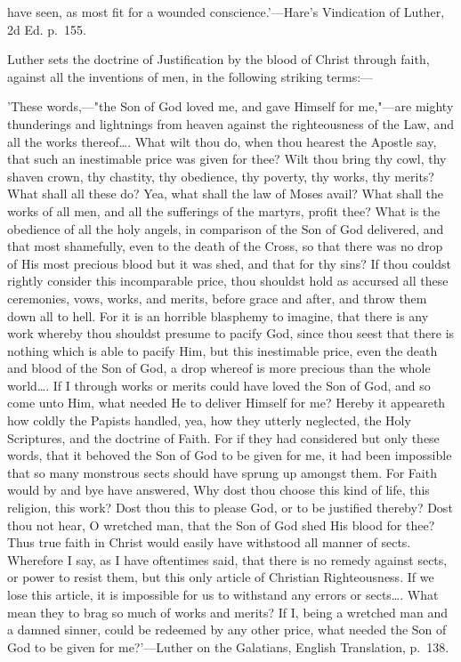 \documentclass[
]{book}
\begin{document}
{have seen, as most fit for a wounded conscience.'---Hare's Vindication of Luther, 2d Ed. p.~155.

  Luther sets the doctrine of Justification by the blood of Christ through faith, against all the inventions of men, in the following striking terms:---

  'These words,---"the Son of God loved me, and gave Himself for me,"---are mighty thunderings and lightnings from heaven against the righteousness of the Law, and all the works thereof\ldots. What wilt thou do, when thou hearest the Apostle say, that such an inestimable price was given for thee? Wilt thou bring thy cowl, thy shaven crown, thy chastity, thy obedience, thy poverty, thy works, thy merits? What shall all these do? Yea, what shall the law of Moses avail? What shall the works of all men, and all the sufferings of the martyrs, profit thee? What is the obedience of all the holy angels, in comparison of the Son of God delivered, and that most shamefully, even to the death of the Cross, so that there was no drop of His most precious blood but it was shed, and that for thy sins? If thou couldst rightly consider this incomparable price, thou shouldst hold as accursed all these ceremonies, vows, works, and merits, before grace and after, and throw them down all to hell. For it is an horrible blasphemy to imagine, that there is any work whereby thou shouldst presume to pacify God, since thou seest that there is nothing which is able to pacify Him, but this inestimable price, even the death and blood of the Son of God, a drop whereof is more precious than the whole world\ldots. If I through works or merits could have loved the Son of God, and so come unto Him, what needed He to deliver Himself for me? Hereby it appeareth how coldly the Papists handled, yea, how they utterly neglected, the Holy Scriptures, and the doctrine of Faith. For if they had considered but only these words, that it behoved the Son of God to be given for me, it had been impossible that so many monstrous sects should have sprung up amongst them. For Faith would by and bye have answered, Why dost thou choose this kind of life, this religion, this work? Dost thou this to please God, or to be justified thereby? Dost thou not hear, O wretched man, that the Son of God shed His blood for thee? Thus true faith in Christ would easily have withstood all manner of sects. Wherefore I say, as I have oftentimes said, that there is no remedy against sects, or power to resist them, but this only article of Christian Righteousness. If we lose this article, it is impossible for us to withstand any errors or sects\ldots. What mean they to brag so much of works and merits? If I, being a wretched man and a damned sinner, could be redeemed by any other price, what needed the Son of God to be given for me?'---Luther on the Galatians, English Translation, p.~138.

}
\end{document}
